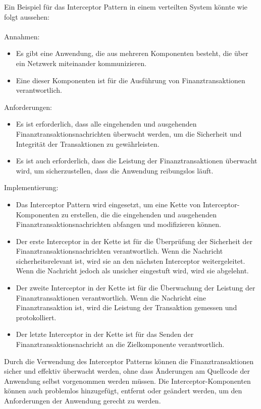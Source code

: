 Ein Beispiel für das Interceptor Pattern in einem verteilten System könnte wie folgt aussehen:
\\\\
Annahmen:\\
\begin{itemize}   
\item Es gibt eine Anwendung, die aus mehreren Komponenten besteht, die über ein Netzwerk miteinander kommunizieren.
\item Eine dieser Komponenten ist für die Ausführung von Finanztransaktionen verantwortlich.
\end{itemize}   
Anforderungen:
\begin{itemize}   
\item Es ist erforderlich, dass alle eingehenden und ausgehenden Finanztransaktionsnachrichten überwacht werden, um die Sicherheit und Integrität der Transaktionen zu gewährleisten.
\item Es ist auch erforderlich, dass die Leistung der Finanztransaktionen überwacht wird, um sicherzustellen, dass die Anwendung reibungslos läuft.
\end{itemize}   
Implementierung:
\begin{itemize}   
\item Das Interceptor Pattern wird eingesetzt, um eine Kette von Interceptor-Komponenten zu erstellen, die die eingehenden und ausgehenden Finanztransaktionsnachrichten abfangen und modifizieren können.
\item Der erste Interceptor in der Kette ist für die Überprüfung der Sicherheit der Finanztransaktionsnachrichten verantwortlich. Wenn die Nachricht sicherheitsrelevant ist, wird sie an den nächsten Interceptor weitergeleitet. Wenn die Nachricht jedoch als unsicher eingestuft wird, wird sie abgelehnt.
\item Der zweite Interceptor in der Kette ist für die Überwachung der Leistung der Finanztransaktionen verantwortlich. Wenn die Nachricht eine Finanztransaktion ist, wird die Leistung der Transaktion gemessen und protokolliert.
\item Der letzte Interceptor in der Kette ist für das Senden der Finanztransaktionsnachricht an die Zielkomponente verantwortlich.
\end{itemize} 
Durch die Verwendung des Interceptor Patterns können die Finanztransaktionen sicher und effektiv überwacht werden, ohne dass Änderungen am Quellcode der Anwendung selbst vorgenommen werden müssen. Die Interceptor-Komponenten können auch problemlos hinzugefügt, entfernt oder geändert werden, um den Anforderungen der Anwendung gerecht zu werden.

